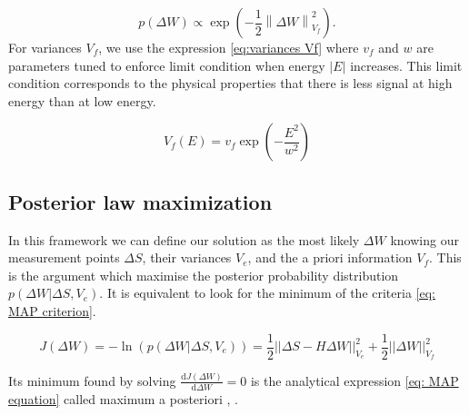 \begin{equation}
p\left( \Delta W \right)  \propto  
\exp\left(
-\frac{1}{2}\left\| \Delta W \right\|^{2}_{V_{f}}  
\right).
\label{eq: prior distribution annexe}
\end{equation}
For variances $V_{f}$, we use the expression \eqref{eq:variances Vf} where $v_f$ and $w$ are parameters tuned to enforce limit condition when energy $\left|E \right|$ increases. This limit condition corresponds to the physical properties that there is less signal at high energy than at low energy.

\begin{equation}
V_{f}\left(E\right) = v_{f}\exp \left( -\frac{E^{2}}{w^{2}} \right)
\label{eq:variances Vf}
\end{equation}

\subsection{\texorpdfstring{Posterior law maximization}{Posterior law maximization}\label{sec: MAP}}



In this framework we can define our solution as the most likely $\Delta W$ knowing our measurement points $\Delta S$, their variances $V_{e}$, and the a priori information $V_{f}$. This is the argument which maximise the posterior probability distribution $p\left(\Delta W |\Delta S , V_{e} \right)$. It is equivalent to look for the minimum of the criteria \eqref{eq: MAP criterion}.

\begin{equation}
J\left(\Delta W\right) = - \ln\left(p\left(\Delta W |\Delta S , V_{e} \right)\right) = \frac{1}{2}||\Delta S - H\Delta W||_{V_{e}}^{2}+\frac{1}{2}||\Delta W||_{V_{f}}^{2} \label{eq: MAP criterion}
\end{equation}

Its minimum found by solving $\frac{\mathrm{d}J\left(\Delta W\right)}{\mathrm{d}\Delta W}  = 0$ is the analytical expression \eqref{eq: MAP equation} called maximum a posteriori \cite{fessler1996mean}, \cite{pereyra2017maximum}.


